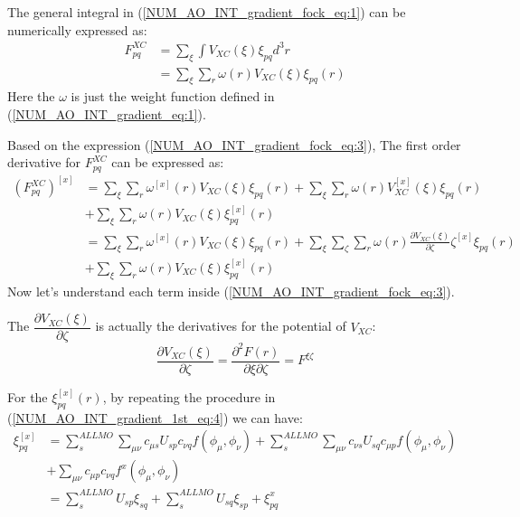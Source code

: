 The general integral in (\ref{NUM_AO_INT_gradient_fock_eq:1}) can be numerically
expressed as:
\begin{equation}
\begin{split}
F^{XC}_{pq} &= \sum_{\xi}\int  V_{XC}(\xi) \xi_{pq} d^{3}r  \\ 
 &= \sum_{\xi}\sum_{r}\omega(r)V_{XC}(\xi) \xi_{pq}(r)
\end{split}
\label{NUM_AO_INT_gradient_fock_eq:3}
\end{equation}
Here the $\omega$ is just the weight function defined in
(\ref{NUM_AO_INT_gradient_eq:1}).

Based on the expression (\ref{NUM_AO_INT_gradient_fock_eq:3}), The first order
derivative for $F^{XC}_{pq}$ can be expressed as:
\begin{align}
\label{NUM_AO_INT_gradient_fock_eq:3}
 (F^{XC}_{pq})^{[x]} &=  
\sum_{\xi}\sum_{r}\omega^{[x]}(r)V_{XC}(\xi) \xi_{pq}(r) +
\sum_{\xi}\sum_{r}\omega(r)V^{[x]}_{XC}(\xi) \xi_{pq}(r) \nonumber \\
&+
\sum_{\xi}\sum_{r}\omega(r)V_{XC}(\xi) \xi^{[x]}_{pq}(r) \nonumber \\
&= \sum_{\xi}\sum_{r}\omega^{[x]}(r)V_{XC}(\xi) \xi_{pq}(r) +
\sum_{\xi}\sum_{\zeta}\sum_{r}\omega(r)\frac{\partial 
V_{XC}(\xi)}{\partial \zeta}\zeta^{[x]} \xi_{pq}(r) \nonumber \\
&+
\sum_{\xi}\sum_{r}\omega(r)V_{XC}(\xi) \xi^{[x]}_{pq}(r)
\end{align}
Now let's understand each term inside (\ref{NUM_AO_INT_gradient_fock_eq:3}).

The $\dfrac{\partial V_{XC}(\xi)}{\partial \zeta}$ is actually the derivatives
for the potential of $V_{XC}$:
\begin{equation}
\label{NUM_AO_INT_gradient_fock_eq:4}
 \frac{\partial V_{XC}(\xi)}{\partial \zeta} = \frac{\partial^{2} F(r)}{
\partial \xi \partial\zeta} = F^{\xi\zeta}
\end{equation}

For the $\xi^{[x]}_{pq}(r)$, by repeating the procedure in
(\ref{NUM_AO_INT_gradient_1st_eq:4}) we can have:
\begin{align}
\label{NUM_AO_INT_gradient_fock_eq:4}
 \xi^{[x]}_{pq}  &=  \sum_{s}^{ALL MO}\sum_{\mu\nu}c_{\mu
 s}U_{sp}c_{\nu q}f(\phi_{\mu}, \phi_{\nu}) 
+ \sum_{s}^{ALL MO}\sum_{\mu\nu}c_{\nu
s}U_{sq}c_{\mu p}f(\phi_{\mu}, \phi_{\nu}) \nonumber \\
&+ \sum_{\mu\nu}c_{\mu p}c_{\nu q}f^{x}(\phi_{\mu}, \phi_{\nu})
\nonumber \\
&= \sum_{s}^{ALL MO}U_{sp}\xi_{sq} + 
\sum_{s}^{ALL MO}U_{sq}\xi_{sp}  + \xi^{x}_{pq}  
\end{align}


